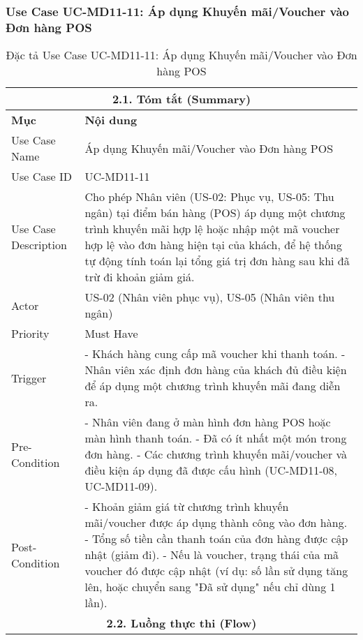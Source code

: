 \subsubsection{Use Case UC-MD11-11: Áp dụng Khuyến mãi/Voucher vào Đơn hàng POS}
\begin{longtable}{|m{4cm}|p{11cm}|}
\caption{Đặc tả Use Case UC-MD11-11: Áp dụng Khuyến mãi/Voucher vào Đơn hàng POS} \label{tab:uc_md11_11_apply_promo_pos} \\
\hline
\multicolumn{2}{|c|}{\textbf{2.1. Tóm tắt (Summary)}} \\
\hline
\textbf{Mục} & \textbf{Nội dung} \\
\hline
\endhead
\midrule
\endfoot
\bottomrule
\endlastfoot
Use Case Name & Áp dụng Khuyến mãi/Voucher vào Đơn hàng POS \\
\hline
Use Case ID & UC-MD11-11 \\
\hline
Use Case Description & Cho phép Nhân viên (US-02: Phục vụ, US-05: Thu ngân) tại điểm bán hàng (POS) áp dụng một chương trình khuyến mãi hợp lệ hoặc nhập một mã voucher hợp lệ vào đơn hàng hiện tại của khách, để hệ thống tự động tính toán lại tổng giá trị đơn hàng sau khi đã trừ đi khoản giảm giá. \\
\hline
Actor & US-02 (Nhân viên phục vụ), US-05 (Nhân viên thu ngân) \\
\hline
Priority & Must Have \\
\hline
Trigger & - Khách hàng cung cấp mã voucher khi thanh toán. \newline - Nhân viên xác định đơn hàng của khách đủ điều kiện để áp dụng một chương trình khuyến mãi đang diễn ra. \\
\hline
Pre-Condition & - Nhân viên đang ở màn hình đơn hàng POS hoặc màn hình thanh toán. \newline - Đã có ít nhất một món trong đơn hàng. \newline - Các chương trình khuyến mãi/voucher và điều kiện áp dụng đã được cấu hình (UC-MD11-08, UC-MD11-09). \\
\hline
Post-Condition & - Khoản giảm giá từ chương trình khuyến mãi/voucher được áp dụng thành công vào đơn hàng. \newline - Tổng số tiền cần thanh toán của đơn hàng được cập nhật (giảm đi). \newline - Nếu là voucher, trạng thái của mã voucher đó được cập nhật (ví dụ: số lần sử dụng tăng lên, hoặc chuyển sang "Đã sử dụng" nếu chỉ dùng 1 lần). \\
\hline
\multicolumn{2}{|c|}{\textbf{2.2. Luồng thực thi (Flow)}} \\

\end{longtable}
